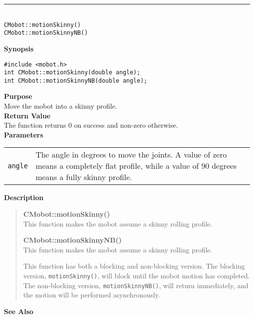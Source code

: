 \noindent
\vspace{5pt}
\rule{4.5in}{0.015in}\\
\noindent
{\LARGE \texttt{CMobot::motionSkinny()}}\\
{\LARGE \texttt{CMobot::motionSkinnyNB()}}\\
{}

\noindent
{\bf Synopsis}
\vspace{-8pt}
\begin{verbatim}
#include <mobot.h>
int CMobot::motionSkinny(double angle);
int CMobot::motionSkinnyNB(double angle);
\end{verbatim}

\noindent
{\bf Purpose}\\
Move the mobot into a skinny profile.\\

\noindent
{\bf Return Value}\\
The function returns 0 on success and non-zero otherwise.\\

\noindent
{\bf Parameters}\\
\vspace{-0.1in}
\begin{description}
\item               
\begin{tabular}{p{10 mm}p{145 mm}}
\texttt{angle} & The angle in degrees to move the joints. A value of zero means a
completely flat profile, while a value of 90 degrees means a fully skinny
profile.  \\
\end{tabular}
\end{description}


\noindent
{\bf Description}\\
\vspace{-12pt}
\begin{quote}
{\bf CMobot::motionSkinny()}\\
This function makes the mobot assume a skinny rolling profile.

{\bf CMobot::motionSkinnyNB()}\\
This function makes the mobot assume a skinny rolling profile.

This function has both a blocking and non-blocking version.
The blocking version, \texttt{motionSkinny()}, will block until the
mobot motion has completed. The non-blocking version, \texttt{motionSkinnyNB()},
will return immediately, and the motion will be performed asynchronously.\\
\end{quote}

\noindent
{\bf See Also}\\

